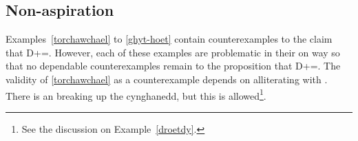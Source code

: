 \subsection{Non-aspiration}
\label{sec:non-aspiration}
Examples~\ref{torchawchael} to \ref{ghyt-hoet} contain counterexamples to the claim that \gls{D}+=\xT. However, each of these examples are problematic in their on way so that  no dependable counterexamples remain to the proposition that \gls{D}+=\xT.
The validity of \ref{torchawchael} as a counterexample depends on  alliterating with . There is an  breaking up the cynghanedd, but this is allowed\footnote{See the discussion on Example~\ref{droetdy}.}. 
